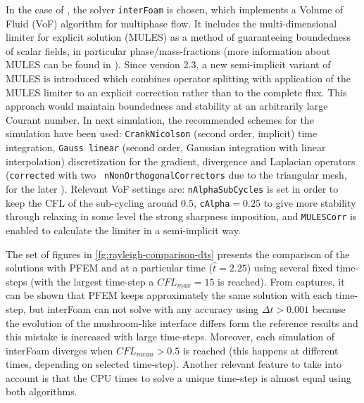 In the case of \OF, the solver \texttt{interFoam} is chosen, which implements a Volume of Fluid (VoF) algorithm for multiphase flow\cite{Berberovic09}. It includes the multi-dimensional limiter for explicit solution (MULES) as a method of guaranteeing boundedness of scalar fields, in particular phase/mass-fractions (more information about MULES can be found in \cite{Marquez13}). Since \OF version 2.3, a new semi-implicit variant of MULES is introduced which combines operator splitting with application of the MULES limiter to an explicit correction rather than to the complete flux. This approach would maintain boundedness and stability at an arbitrarily large Courant number. In next simulation, the recommended schemes for the simulation have been used: \texttt{CrankNicolson} (second order, implicit) time integration, \texttt{Gauss linear} (second order, Gaussian integration with linear interpolation) discretization for the gradient, divergence and Laplacian operators (\texttt{corrected} with two \texttt{
nNonOrthogonalCorrectors} due to the triangular mesh, for the later ). Relevant VoF settings are: \texttt{nAlphaSubCycles} is set in order to keep the CFL of the sub-cycling around $0.5$, \texttt{cAlpha}$=0.25$ to give more stability through relaxing in some level the strong sharpness imposition, and \texttt{MULESCorr} is enabled to calculate the limiter in a semi-implicit way.

The set of figures in \ref{fg:rayleigh-comparison-dts} presents the comparison of the solutions with PFEM and \OF at a particular time ($\widehat{t}=2.25$) using several fixed time-steps (with the largest time-step a $CFL_{max}=15$ is reached). From captures, it can be shown that PFEM keeps approximately the same solution with each time-step, but interFoam can not solve with any accuracy using $\Delta t>0.001$ because the evolution of the mushroom-like interface differs form the reference results and this mistake is increased with large time-steps. Moreover, each simulation of interFoam diverges when $CFL_{mean}>0.5$ is reached (this happens at different times, depending on selected time-step). Another relevant feature to take into account is that the CPU times to solve a unique time-step is almost equal using both algorithms.

